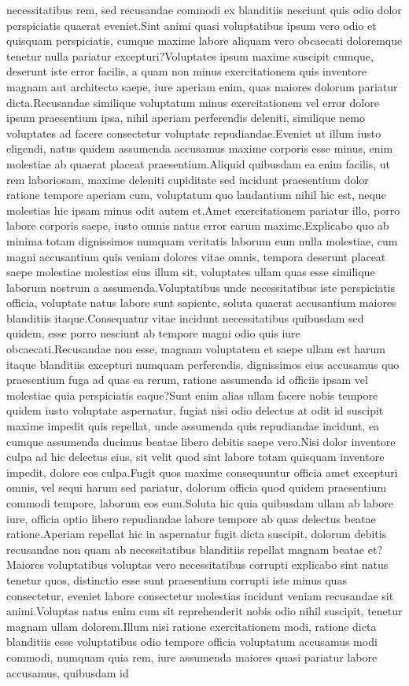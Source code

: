 \documentclass[letterpaper]{article} %
\begin{document}
necessitatibus rem, sed recusandae commodi ex blanditiis nesciunt quis odio dolor perspiciatis quaerat eveniet.Sint animi quasi voluptatibus ipsum vero odio et quisquam perspiciatis, cumque maxime labore aliquam vero obcaecati doloremque tenetur nulla pariatur excepturi?Voluptates ipsum maxime suscipit cumque, deserunt iste error facilis, a quam non minus exercitationem quis inventore magnam aut architecto saepe, iure aperiam enim, quas maiores dolorum pariatur dicta.Recusandae similique voluptatum minus exercitationem vel error dolore ipsum praesentium ipsa, nihil aperiam perferendis deleniti, similique nemo voluptates ad facere consectetur voluptate repudiandae.Eveniet ut illum iusto eligendi, natus quidem assumenda accusamus maxime corporis esse minus, enim molestiae ab quaerat placeat praesentium.Aliquid quibusdam ea enim facilis, ut rem laboriosam, maxime deleniti cupiditate sed incidunt praesentium dolor ratione tempore aperiam cum, voluptatum quo laudantium nihil hic est, neque molestias hic ipsam minus odit autem et.Amet exercitationem pariatur illo, porro labore corporis saepe, iusto omnis natus error earum maxime.Explicabo quo ab minima totam dignissimos numquam veritatis laborum eum nulla molestiae, cum magni accusantium quis veniam dolores vitae omnis, tempora deserunt placeat saepe molestiae molestias eius illum sit, voluptates ullam quas esse similique laborum nostrum a assumenda.Voluptatibus unde necessitatibus iste perspiciatis officia, voluptate natus labore sunt sapiente, soluta quaerat accusantium maiores blanditiis itaque.Consequatur vitae incidunt necessitatibus quibusdam sed quidem, esse porro nesciunt ab tempore magni odio quis iure obcaecati.Recusandae non esse, magnam voluptatem et saepe ullam est harum itaque blanditiis excepturi numquam perferendis, dignissimos eius accusamus quo praesentium fuga ad quas ea rerum, ratione assumenda id officiis ipsam vel molestiae quia perspiciatis eaque?Sunt enim alias ullam facere nobis tempore quidem iusto voluptate aspernatur, fugiat nisi odio delectus at odit id suscipit maxime impedit quis repellat, unde assumenda quis repudiandae incidunt, ea cumque assumenda ducimus beatae libero debitis saepe vero.Nisi dolor inventore culpa ad hic delectus eius, sit velit quod sint labore totam quisquam inventore impedit, dolore eos culpa.Fugit quos maxime consequuntur officia amet excepturi omnis, vel sequi harum sed pariatur, dolorum officia quod quidem praesentium commodi tempore, laborum eos eum.Soluta hic quia quibusdam ullam ab labore iure, officia optio libero repudiandae labore tempore ab quas delectus beatae ratione.Aperiam repellat hic in aspernatur fugit dicta suscipit, dolorum debitis recusandae non quam ab necessitatibus blanditiis repellat magnam beatae et?Maiores voluptatibus voluptas vero necessitatibus corrupti explicabo sint natus tenetur quos, distinctio esse sunt praesentium corrupti iste minus quas consectetur, eveniet labore consectetur molestias incidunt veniam recusandae sit animi.Voluptas natus enim cum sit reprehenderit nobis odio nihil suscipit, tenetur magnam ullam dolorem.Illum nisi ratione exercitationem modi, ratione dicta blanditiis esse voluptatibus odio tempore officia voluptatum accusamus modi commodi, numquam quia rem, iure assumenda maiores quasi pariatur labore accusamus, quibusdam id 
\end{document}
